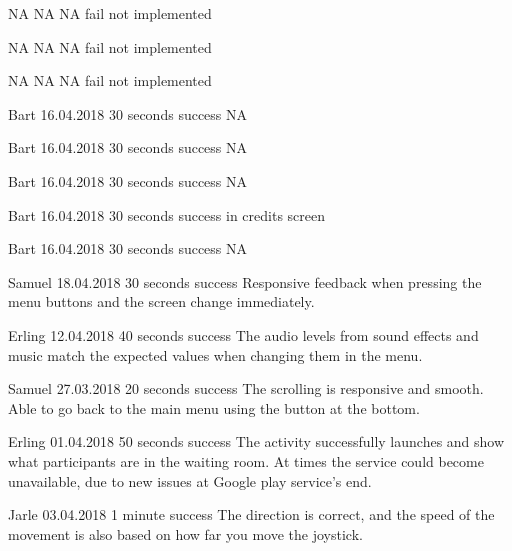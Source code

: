{NA}
{NA}
{NA}
{fail}
{not implemented}

{NA}
{NA}
{NA}
{fail}
{not implemented}

{NA}
{NA}
{NA}
{fail}
{not implemented}

{Bart}
{16.04.2018}
{30 seconds}
{success}
{NA}

{Bart}
{16.04.2018}
{30 seconds}
{success}
{NA}


{Bart}
{16.04.2018}
{30 seconds}
{success}
{NA}

{Bart}
{16.04.2018}
{30 seconds}
{success}
{in credits screen}

{Bart}
{16.04.2018}
{30 seconds}
{success}
{NA}

{Samuel}
{18.04.2018}
{30 seconds}
{success}
{Responsive feedback when pressing the menu buttons and the screen change immediately.}

{Erling}
{12.04.2018}
{40 seconds}
{success}
{The audio levels from sound effects and music match the expected values when changing them in the menu.}

{Samuel}
{27.03.2018}
{20 seconds}
{success}
{The scrolling is responsive and smooth. Able to go back to the main menu using the button at the bottom.}

{Erling}
{01.04.2018}
{50 seconds}
{success}
{The activity successfully launches and show what participants are in the waiting room. At times the service could become unavailable, due to new issues at Google play service’s end.}

{Jarle}
{03.04.2018}
{1 minute}
{success}
{The direction is correct, and the speed of the movement is also based on how far you move the joystick.}

